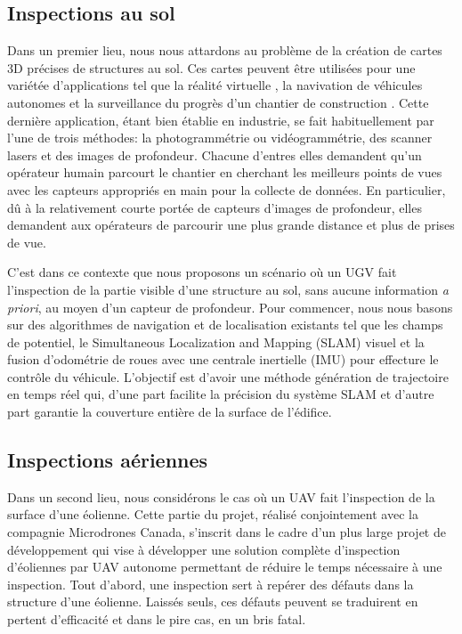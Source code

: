 \subsection{Inspections au sol}
Dans un premier lieu, nous nous attardons au problème de la création de cartes 3D précises de structures au sol. Ces cartes peuvent être utilisées pour une variétée d'applications tel que la réalité virtuelle \citep{googlevr2017}, la navivation de véhicules autonomes \citep{deepmap2017} et la surveillance du progrès d'un chantier de construction \citep{Omar2018}. Cette dernière application, étant bien établie en industrie, se fait habituellement par l'une de trois méthodes: la photogrammétrie ou vidéogrammétrie, des scanner lasers et des images de profondeur. Chacune d'entres elles demandent qu'un opérateur humain parcourt le chantier en cherchant les meilleurs points de vues avec les capteurs appropriés en main pour la collecte de données. En particulier, dû à la relativement courte portée de capteurs d'images de profondeur, elles demandent aux opérateurs de parcourir une plus grande distance et plus de prises de vue.

C'est dans ce contexte que nous proposons un scénario où un UGV fait l'inspection de la partie visible d'une structure au sol, sans aucune information \textit{a priori}, au moyen d'un capteur de profondeur. Pour commencer, nous nous basons sur des algorithmes de navigation et de localisation existants tel que les champs de potentiel, le Simultaneous Localization and Mapping (SLAM) visuel et la fusion d'odométrie de roues avec une centrale inertielle (IMU) pour effecture le contrôle du véhicule. L'objectif est d'avoir une méthode génération de trajectoire en temps réel qui, d'une part facilite la précision du système SLAM et d'autre part garantie la couverture entière de la surface de l'édifice.

\subsection{Inspections aériennes}
Dans un second lieu, nous considérons le cas où un UAV fait l'inspection de la surface d'une éolienne. Cette partie du projet, réalisé conjointement avec la compagnie Microdrones Canada, s'inscrit dans le cadre d'un plus large projet de développement qui vise à développer une solution complète d'inspection d'éoliennes par UAV autonome permettant de réduire le temps nécessaire à une inspection. Tout d'abord, une inspection sert à repérer des défauts dans la structure d'une éolienne. Laissés seuls, ces défauts peuvent se traduirent en pertent d'efficacité et dans le pire cas, en un bris fatal.

